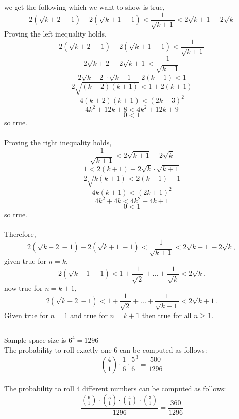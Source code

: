 \documentclass[]{article}
\begin{document}
we get the following which we want to show is true,
$$2(\sqrt{k+2}-1) - 2(\sqrt{k+1}-1)< \frac{1}{\sqrt{k+1}} < 2\sqrt{k+1} -2\sqrt{k}$$
Proving the left inequality holds,
$$2(\sqrt{k+2}-1) - 2(\sqrt{k+1}-1)< \frac{1}{\sqrt{k+1}}$$
$$2\sqrt{k+2} - 2\sqrt{k+1}< \frac{1}{\sqrt{k+1}}$$
$$2\sqrt{k+2} \cdot {\sqrt{k+1}} - 2(k+1)< 1$$
$$2\sqrt{(k+2)(k+1)} < 1+ 2(k+1)$$
$$4(k+2)(k+1) < (2k+3)^2$$
$$4k^2 +12k+8 < 4k^2 +12k+9$$
$$ 0 < 1 $$
so true.
\\
\\
Proving the right inequality holds,
$$\frac{1}{\sqrt{k+1}} < 2\sqrt{k+1} -2\sqrt{k}$$
$$1 < 2(k+1) -2\sqrt{k} \cdot \sqrt{k+1}$$
$$ 2\sqrt{k(k+1)} < 2(k+1) -1$$
$$ 4k(k+1) < (2k +1)^2$$
$$ 4k^2 +4k < 4k^2 + 4k +1$$
$$ 0 < 1 $$
so true.
\\
\\
Therefore,
$$2(\sqrt{k+2}-1) - 2(\sqrt{k+1}-1)< \frac{1}{\sqrt{k+1}} < 2\sqrt{k+1} -2\sqrt{k},$$
given true for $n = k$,
$$2(\sqrt{k+1}-1)<1 + \frac{1}{\sqrt{2}} + ... + \frac{1}{\sqrt{k}} < 2\sqrt{k}.$$
now true for $n = k+1$,
$$2(\sqrt{k+2}-1)<1 + \frac{1}{\sqrt{2}} + ... + \frac{1}{\sqrt{k+1}} < 2\sqrt{k+1}.$$
Given true for $n = 1$ and true for $n = k + 1$ then true for all $n\geq 1$.


\subsection{}
Sample space size is $6^4 = 1296$
\\
The probability to roll exactly one 6 can be computed as follows:
\\
$${4 \choose 1} \cdot \frac{1}{6} \cdot \frac{5}{6} ^ 3 = \frac{500}{1296}$$
\\
The probability to roll 4 different numbers can be computed as follows:
\\
$$ \frac{{6 \choose 1} \cdot {5 \choose 1} \cdot {4 \choose 1} \cdot {3 \choose 1}}{1296}   = \frac{360}{1296}$$
\end{document}
